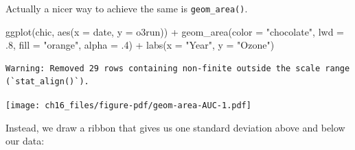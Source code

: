 \documentclass[
  letterpaper,
]{scrbook}
\newenvironment{Shaded}{\begin{snugshade}}{\end{snugshade}}
\newcommand{\AttributeTok}[1]{\textcolor[rgb]{0.40,0.45,0.13}{#1}}
\newcommand{\DecValTok}[1]{\textcolor[rgb]{0.68,0.00,0.00}{#1}}
\newcommand{\FunctionTok}[1]{\textcolor[rgb]{0.28,0.35,0.67}{#1}}
\newcommand{\NormalTok}[1]{\textcolor[rgb]{0.00,0.23,0.31}{#1}}
\newcommand{\SpecialCharTok}[1]{\textcolor[rgb]{0.37,0.37,0.37}{#1}}
\newcommand{\StringTok}[1]{\textcolor[rgb]{0.13,0.47,0.30}{#1}}
\begin{document}
\begin{tcolorbox}[enhanced jigsaw, rightrule=.15mm, arc=.35mm, title=\textcolor{quarto-callout-tip-color}{\faLightbulb}\hspace{0.5em}{Using \texttt{geom\_area()}}, colback=white, toptitle=1mm, colbacktitle=quarto-callout-tip-color!10!white, breakable, left=2mm, opacityback=0, leftrule=.75mm, bottomrule=.15mm, bottomtitle=1mm, colframe=quarto-callout-tip-color-frame, coltitle=black, toprule=.15mm, opacitybacktitle=0.6, titlerule=0mm]

Actually a nicer way to achieve the same is \texttt{geom\_area()}.

\begin{Shaded}
\begin{Highlighting}[]
\FunctionTok{ggplot}\NormalTok{(chic, }\FunctionTok{aes}\NormalTok{(}\AttributeTok{x =}\NormalTok{ date, }\AttributeTok{y =}\NormalTok{ o3run)) }\SpecialCharTok{+}
   \FunctionTok{geom\_area}\NormalTok{(}\AttributeTok{color =} \StringTok{"chocolate"}\NormalTok{, }\AttributeTok{lwd =}\NormalTok{ .}\DecValTok{8}\NormalTok{,}
             \AttributeTok{fill =} \StringTok{"orange"}\NormalTok{, }\AttributeTok{alpha =}\NormalTok{ .}\DecValTok{4}\NormalTok{) }\SpecialCharTok{+}
   \FunctionTok{labs}\NormalTok{(}\AttributeTok{x =} \StringTok{"Year"}\NormalTok{, }\AttributeTok{y =} \StringTok{"Ozone"}\NormalTok{)}
\end{Highlighting}
\end{Shaded}

\begin{verbatim}
Warning: Removed 29 rows containing non-finite outside the scale range
(`stat_align()`).
\end{verbatim}

\texttt{[image: ch16\_files/figure-pdf/geom-area-AUC-1.pdf]}

\end{tcolorbox}

Instead, we draw a ribbon that gives us one standard deviation above and
below our data:
\end{document}

